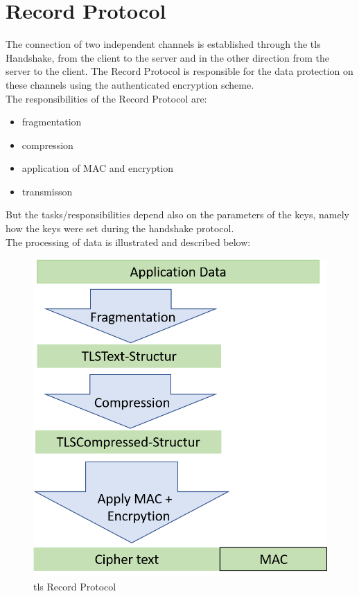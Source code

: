 \section{Record Protocol}
\label{sec:record_protocol}

The connection of two independent channels is established through the \gls{tls} Handshake, from the client to the server and in the other direction from the server to the client. The Record Protocol is responsible for the data protection on these channels using the authenticated encryption scheme.\\
The responsibilities of the Record Protocol are:
\begin{itemize}
	\item fragmentation
	\item compression
	\item application of MAC and encryption
	\item transmisson 
\end{itemize}
But the tasks/responsibilities depend also on the parameters of the keys, namely how the keys were set during the handshake protocol. \\
The processing of data is illustrated and described below:      

\begin{figure}[H]
	\centering
		\includegraphics[scale=0.5]{images/tls_recordprotocol.png}
	\caption{\gls{tls} Record Protocol}
	\label{fig:tls_recordprotocol}
\end{figure}

